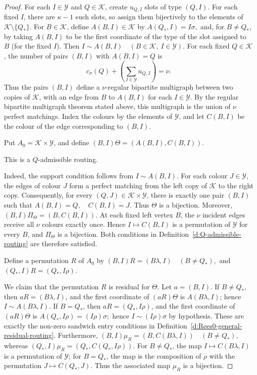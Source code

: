\documentclass[11pt]{article}
\theoremstyle{plain}
\theoremstyle{remark}
\theoremstyle{definition}
\theoremstyle{plain}
\begin{document}
\begin{proof}
For each $I\in\mathcal Y$ and $Q\in\mathcal K$, create $u_{Q,I}$ slots of type $(Q,I)$. For each fixed $I$, there are $\kappa-1$ such slots, so assign them bijectively
to the elements of $\mathcal K\setminus\{Q_\ast\}$. For $B \in \mathcal K$, define $A(B,I)\in\mathcal K$ by
\(A(Q_\ast,I)=I\sigma,\)
and, for $B\ne Q_\ast$, by taking $A(B,I)$ to be the first coordinate of the type of the
slot assigned to $B$ (for the fixed $I$). Then
\(I\sim A(B,I) \quad(B\in\mathcal K,\ I\in\mathcal Y).\)
For each fixed $Q\in\mathcal K$, the number of pairs $(B,I)$ with
$A(B,I)=Q$ is
\[
        c_\sigma(Q)+\left(\sum_{I\in\mathcal Y}u_{Q,I}\right)=\nu.
\]
Thus the pairs $(B,I)$ define a $\nu$-regular bipartite multigraph between two
copies of $\mathcal K$, with an edge from $B$ to $A(B,I)$ for each
$I\in\mathcal Y$. By the regular bipartite multigraph theorem stated above, this multigraph is
the union of $\nu$ perfect matchings. Index the colours by the elements of
$\mathcal Y$, and let $C(B,I)$ be the colour of the edge corresponding to
$(B,I)$.

Put $A_0=\mathcal K\times\mathcal Y$, and define
\((B,I)\Theta=(A(B,I),C(B,I)).\)

	 This is a $Q$-admissible routing.

Indeed, the support condition follows from
$I\sim A(B,I)$. For each colour $J\in\mathcal Y$, the edges of colour $J$
form a perfect matching from the left copy of $\mathcal K$ to the right copy.
Consequently, for every $(Q,J)\in\mathcal K\times\mathcal Y$, there is exactly
one pair $(B,I)$ such that
\(A(B,I)=Q, \quad C(B,I)=J.\)
Thus $\Theta$ is a bijection. Moreover,
\((B,I)\Pi_\Theta=(B,C(B,I)).\)
At each fixed left vertex $B$, the $\nu$ incident edges receive all $\nu$
colours exactly once. Hence $I\mapsto C(B,I)$ is a permutation of
$\mathcal Y$ for every $B$, and $\Pi_\Theta$ is a bijection. Both conditions
in Definition~\ref{d:Q-admissible-routing} are therefore satisfied.

 Define a permutation $R$ of $A_0$ by
\((B,I)R=(B\lambda,I) \quad(B\ne Q_\ast),\)
and
\((Q_\ast,I)R=(Q_\ast,I\rho).\)

We claim that the permutation $R$ is residual for $\Theta$. Let $a=(B,I)$. If $B\ne Q_\ast$, then
$aR=(B\lambda,I)$, and the first coordinate of $(aR)\Theta$ is
$A(B\lambda,I)$; hence $I\sim A(B\lambda,I)$. If $B=Q_\ast$, then
$aR=(Q_\ast,I\rho)$, and the first coordinate of $(aR)\Theta$ is
\(A(Q_\ast,I\rho)=(I\rho)\sigma;\)
hence $I\sim(I\rho)\sigma$ by hypothesis. These are exactly the non-zero
sandwich entry conditions in
Definition~\ref{d:Rees0-general-residual-routing}. Furthermore,
\((B,I)\mu_R=(B,C(B\lambda,I)) \quad(B\ne Q_\ast),\)
whereas
\((Q_\ast,I)\mu_R=(Q_\ast,C(Q_\ast,I\rho)).\)
For $B\ne Q_\ast$, the map $I\mapsto C(B\lambda,I)$ is a permutation of
$\mathcal Y$; for $B=Q_\ast$, the map is the composition of $\rho$ with the
permutation $J\mapsto C(Q_\ast,J)$. Thus the associated map $\mu_R$ is a bijection.


\end{proof}
\end{document}

